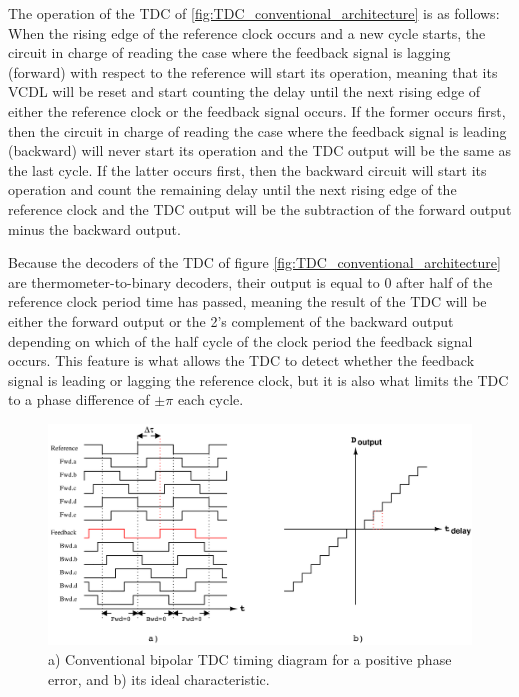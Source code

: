 The operation of the TDC of \ref{fig:TDC_conventional_architecture} is as follows: When the rising edge of the reference clock occurs and a new cycle starts, the circuit in charge of reading the 
case where the feedback signal is lagging (forward) with respect to the reference will start its operation, meaning that its VCDL will be reset and start counting the delay until the next rising 
edge of either the reference clock or the feedback signal occurs. If the former occurs first, then the circuit in charge of reading the case where the feedback signal is leading (backward) will 
never start its operation and the TDC output will be the same as the last cycle. If the latter occurs first, then the backward circuit will start its operation and count the remaining delay until
the next rising edge of the reference clock and the TDC output will be the subtraction of the forward output minus the backward output.

Because the decoders of the TDC of figure \ref{fig:TDC_conventional_architecture} are thermometer-to-binary decoders, their output is equal to 0 after half of the reference clock period time has
passed, meaning the result of the TDC will be either the forward output or the 2's complement of the backward output depending on which of the half cycle of the clock period the feedback signal
occurs. This feature is what allows the TDC to detect whether the feedback signal is leading or lagging the reference clock, but it is also what limits the TDC to a phase difference of $\pm \pi$
each cycle.

\begin{figure}[H]
    \centering
    \includegraphics[width=1\textwidth]{figures/TDC_timing_diagram.png}
    \caption{a) Conventional bipolar TDC timing diagram for a positive phase error, and b) its ideal characteristic.}
    \label{fig:TDC_conventional_timing_diagram}
\end{figure}

